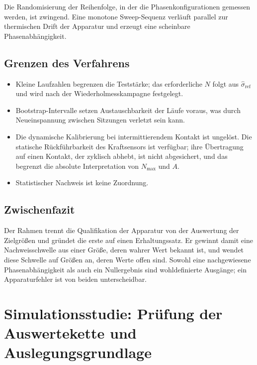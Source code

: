 \documentclass[12pt,a4paper]{report}
\begin{document}
Die Randomisierung der Reihenfolge, in der die Phasenkonfigurationen
gemessen werden, ist zwingend. Eine monotone Sweep-Sequenz verläuft
parallel zur thermischen Drift der Apparatur und erzeugt eine scheinbare
Phasenabhängigkeit.

\section{Grenzen des Verfahrens}

\begin{itemize}
  \item Kleine Laufzahlen begrenzen die Teststärke; das erforderliche $N$
        folgt aus $\hat{\sigma}_{\mathrm{ref}}$ und wird nach der
        Wiederholmesskampagne festgelegt.
  \item Bootstrap-Intervalle setzen Austauschbarkeit der Läufe voraus,
        was durch Neueinspannung zwischen Sitzungen verletzt sein kann.
  \item Die dynamische Kalibrierung bei intermittierendem Kontakt ist
        ungelöst. Die statische Rückführbarkeit des Kraftsensors ist
        verfügbar; ihre Übertragung auf einen Kontakt, der zyklisch
        abhebt, ist nicht abgesichert, und das begrenzt die absolute
        Interpretation von $N_{\max}$ und $A$.
  \item Statistischer Nachweis ist keine Zuordnung.
\end{itemize}

\section{Zwischenfazit}

Der Rahmen trennt die Qualifikation der Apparatur von der Auswertung der
Zielgrößen und gründet die erste auf einen Erhaltungssatz. Er gewinnt
damit eine Nachweisschwelle aus einer Größe, deren wahrer Wert bekannt
ist, und wendet diese Schwelle auf Größen an, deren Werte offen sind.
Sowohl eine nachgewiesene Phasenabhängigkeit als auch ein Nullergebnis
sind wohldefinierte Ausgänge; ein Apparaturfehler ist von beiden
unterscheidbar.


\chapter{Simulationsstudie: Prüfung der Auswertekette und Auslegungsgrundlage}
\label{chap:simulation}
\end{document}
